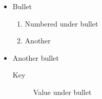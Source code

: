 \documentclass{article}
\begin{document}
\begin{itemize}
  \item Bullet
  \begin{enumerate}
    \item Numbered under bullet
    \item Another
  \end{enumerate}
  \item Another bullet
  \begin{description}
    \item[Key] Value under bullet
  \end{description}
\end{itemize}
\end{document}
